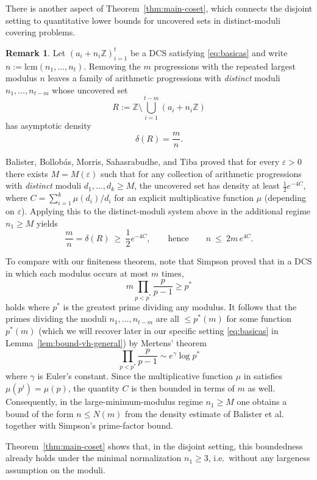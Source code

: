 \documentclass[11pt,reqno]{amsart}
\theoremstyle{definition}
\newtheorem{remark}[theorem]{Remark}
\newcommand{\Z}{\mathbb{Z}}
\begin{document}
There is another aspect of Theorem~\ref{thm:main-coset}, which connects the disjoint setting to quantitative
lower bounds for uncovered sets in distinct-moduli covering problems.

\begin{remark}\label{rem:balister-simpson}
Let \((a_i+n_i\Z)_{i=1}^t\) be a DCS satisfying \eqref{eq:basicas} and write \(n:= \mathrm{lcm}(n_1,\dots,n_t)\).
Removing the \(m\) progressions with the repeated largest modulus \(n\) leaves a family of arithmetic progressions with
\emph{distinct} moduli \(n_1,\dots,n_{t-m}\) whose uncovered set
\[
R:=\Z\setminus \bigcup_{i=1}^{t-m} (a_i+n_i\Z)
\]
has asymptotic density
\[
\delta(R)=\frac{m}{n}.
\]

Balister, Bollobás, Morris, Sahasrabudhe, and Tiba \cite{BBMST} proved that for every \(\varepsilon>0\) there exists \(M=M(\varepsilon)\) such that
for any collection of arithmetic progressions with \emph{distinct} moduli \(d_1,\dots,d_k\ge M\), the uncovered set has density
at least \(\tfrac12 e^{-4C}\), where \(C=\sum_{i=1}^k \mu(d_i)/d_i\) for an explicit multiplicative function \(\mu\)
(depending on \(\varepsilon\)).
Applying this to the distinct-moduli system above in the additional regime \(n_1\ge M\) yields
\[
\frac{m}{n}=\delta(R)\ \ge\ \frac12 e^{-4C},
\qquad\text{hence}\qquad
n\ \le\ 2m\,e^{4C}.
\]

To compare with our finiteness theorem, note that Simpson \cite{Simpson} proved that in a DCS in which
each modulus occurs at most \(m\) times,
\[
m\prod_{p < p^*} \frac{p}{p-1} \ge p^* 
\]
holds where \(p^*\) is the greatest prime dividing any modulus. It follows that the primes dividing the moduli \(n_1,\dots,n_{t-m}\) are all \(\le p^*(m)\) for some function \(p^*(m)\) (which we will recover later in our specific setting \eqref{eq:basicas} in Lemma~\ref{lem:bound-vh-general}) by Mertens’ theorem
\[
\prod_{p < p^*} \frac{p}{p-1} \sim e^\gamma \log p^* 
\]
where \(\gamma\) is Euler's constant.
Since the multiplicative function \(\mu\) in \cite{BBMST} satisfies \(\mu(p^i) = \mu(p)\), the quantity 
\(C\) is then bounded in terms of \(m\) as well.
Consequently, in the large-minimum-modulus regime \(n_1\ge M\) one obtains a bound of the form \(n\le N(m)\) from the density estimate of Balister et al. together with Simpson's prime-factor bound.

Theorem~\ref{thm:main-coset} shows that, in the disjoint setting, this boundedness already holds under the minimal
normalization \(n_1\ge 3\), i.e.\ without any largeness assumption on the moduli.
\end{remark}
\end{document}
